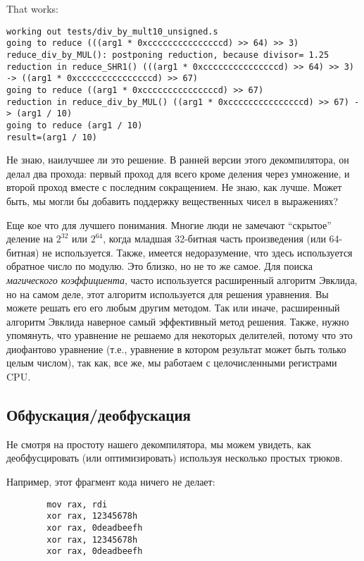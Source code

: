 That works:

\begin{lstlisting}
working out tests/div_by_mult10_unsigned.s
going to reduce (((arg1 * 0xcccccccccccccccd) >> 64) >> 3)
reduce_div_by_MUL(): postponing reduction, because divisor= 1.25
reduction in reduce_SHR1() (((arg1 * 0xcccccccccccccccd) >> 64) >> 3) -> ((arg1 * 0xcccccccccccccccd) >> 67)
going to reduce ((arg1 * 0xcccccccccccccccd) >> 67)
reduction in reduce_div_by_MUL() ((arg1 * 0xcccccccccccccccd) >> 67) -> (arg1 / 10)
going to reduce (arg1 / 10)
result=(arg1 / 10)
\end{lstlisting}

Не знаю, наилучшее ли это решение. В ранней версии этого декомпилятора, он делал два прохода:
первый проход для всего кроме деления через умножение, и второй проход вместе с последним сокращением.
Не знаю, как лучше.
Может быть, мы могли бы добавить поддержку вещественных чисел в выражениях?

Еще кое что для лучшего понимания.
Многие люди не замечают ``скрытое'' деление на $2^{32}$ или $2^{64}$,
когда младшая 32-битная часть произведения (или 64-битная) не используется.
Также, имеется недоразумение, что здесь используется обратное число по модулю.
Это близко, но не то же самое.
Для поиска \textit{магического коэффициента}, часто используется расширенный алгоритм Эвклида, но на самом деле,
этот алгоритм используется для решения уравнения.
Вы можете решать его его любым другим методом.
Так или иначе, расширенный алгоритм Эвклида наверное самый эффективный метод решения.
Также, нужно упомянуть, что уравнение не решаемо для некоторых делителей, потому что это диофантово уравнение
(т.е., уравнение в котором результат может быть только целым числом), так как, все же, мы работаем с целочисленными
регистрами CPU.

\subsection{Обфускация/деобфускация}

Не смотря на простоту нашего декомпилятора, мы можем увидеть, как деобфусцировать (или оптимизировать) используя
несколько простых трюков.

Например, этот фрагмент кода ничего не делает:

\begin{lstlisting}
        mov rax, rdi
        xor rax, 12345678h
        xor rax, 0deadbeefh
        xor rax, 12345678h
        xor rax, 0deadbeefh
\end{lstlisting}

